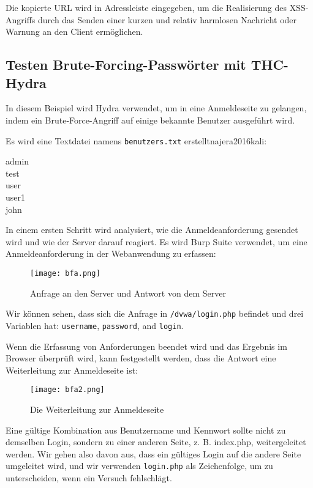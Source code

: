 Die kopierte URL wird in Adressleiste eingegeben, um die Realisierung des XSS-Angriffs durch das Senden einer kurzen und relativ harmlosen Nachricht oder Warnung an den Client ermöglichen.

\subsection{Testen Brute-Forcing-Passwörter mit THC-Hydra}

In diesem Beispiel wird Hydra verwendet, um in eine Anmeldeseite zu gelangen, indem ein Brute-Force-Angriff auf einige bekannte Benutzer ausgeführt wird\cite[143]{najera2016kali}.

Es wird eine Textdatei namens \texttt{benutzers.txt} erstellt{najera2016kali}:

\begin{center}
	admin\\test\\user\\user1\\john
\end{center}

In einem ersten Schritt wird analysiert, wie die Anmeldeanforderung gesendet wird und wie der Server darauf reagiert. Es wird Burp Suite verwendet, um eine Anmeldeanforderung in der Webanwendung zu erfassen\cite[144]{najera2016kali}:

\newpage

\begin{figure}[h]
	\centering
	\texttt{[image: bfa.png]}
	\caption{Anfrage an den Server und Antwort von dem Server}
\end{figure}

Wir können sehen, dass sich die Anfrage in \texttt{/dvwa/login.php} befindet und drei Variablen hat: \texttt{username}, \texttt{password}, and \texttt{login}.

Wenn die Erfassung von Anforderungen beendet wird und das Ergebnis im Browser überprüft wird, kann festgestellt werden, dass die Antwort eine Weiterleitung zur Anmeldeseite ist\cite[144]{najera2016kali}:

\begin{figure}[h]
	\centering
	\texttt{[image: bfa2.png]}
	\caption{Die Weiterleitung zur Anmeldeseite}
\end{figure}

Eine gültige Kombination aus Benutzername und Kennwort sollte nicht zu demselben Login, sondern zu einer anderen Seite, z. B. index.php, weitergeleitet werden. Wir gehen also davon aus, dass ein gültiges Login auf die andere Seite umgeleitet wird, und wir verwenden \texttt{login.php} als Zeichenfolge, um zu unterscheiden, wenn ein Versuch fehlschlägt\cite[145]{najera2016kali}.

